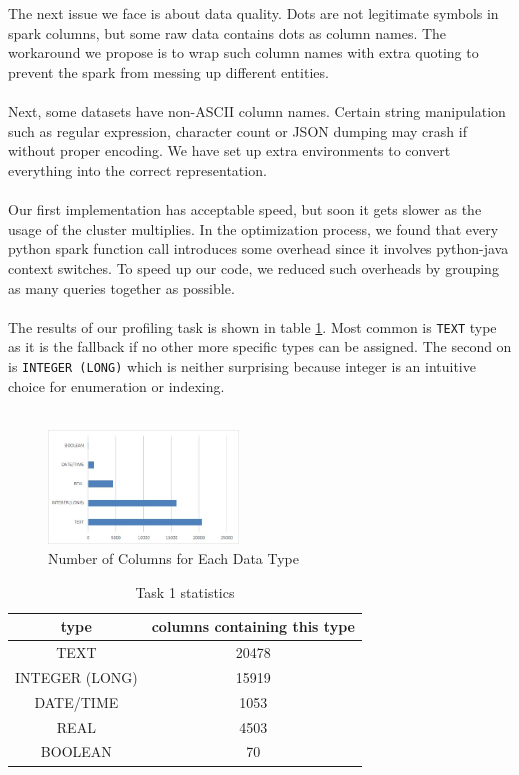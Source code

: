 \documentclass[sigconf]{acmart}
\begin{document}
\\\\
The next issue we face is about data quality. Dots are not legitimate symbols in spark columns, but some raw data contains dots as column names. The workaround we propose is to wrap such column names with extra quoting to prevent the spark from messing up different entities. 
\\\\
Next, some datasets have non-ASCII column names. Certain string manipulation such as regular expression, character count or JSON dumping may crash if without proper encoding. We have set up extra environments to convert everything into the correct representation.
\\\\
Our first implementation has acceptable speed, but soon it gets slower as the usage of the cluster multiplies. In the optimization process, we found that every python spark function call introduces some overhead since it involves python-java context switches. To speed up our code, we reduced such overheads by grouping as many queries together as possible. 
\\\\
The results of our profiling task is shown in table \ref{tk1tb}. Most common is \verb|TEXT| type as it is the fallback if no other more specific types can be assigned. The second on is \verb|INTEGER (LONG)| which is neither surprising because integer is an intuitive choice for enumeration or indexing.
\\\\
\begin{figure}[h]
    \centering
    \includegraphics[width=0.45\textwidth]{num_of_each_datatype.jpg}
    \caption{Number of Columns for Each Data Type}
    \label{fig:mesh1}
\end{figure}
\begin{table}[h]
    \centering
    \begin{tabular}{ |c|c| }
        \hline
        type & columns containing this type \\
        \hline
        TEXT & 20478 \\
        INTEGER (LONG) & 15919 \\
        DATE/TIME & 1053 \\
        REAL & 4503 \\
        BOOLEAN & 70 \\
        \hline
    \end{tabular}
    \caption{Task 1 statistics}
    \label{tk1tb}
\end{table}
\end{document}
